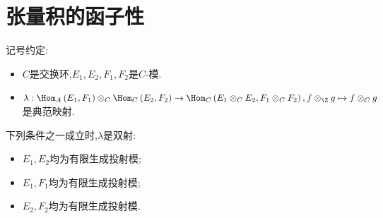 \section{张量积的函子性}

记号约定:

\begin{itemize}
	\item $C$是交换环,$E_{1},E_{2},F_{1},F_{2}$是$C$-模.
	\item $\lambda:\Hom_{A}\left(E_{1},F_{1}\right)\otimes_{C}\Hom_{C}\left(E_{2},F_{2}\right)\to\Hom_{C}\left(E_{1}\otimes_{C}E_{2},F_{1}\otimes_{C}F_{2}\right),f\otimes_{\Z}g\mapsto f\otimes_{C}g$是典范映射.
\end{itemize}

\begin{proposition}{}{}
	下列条件之一成立时,$\lambda$是双射:
	\begin{itemize}
		\item $E_{1},E_{2}$均为有限生成投射模;
		\item $E_{1},F_{1}$均为有限生成投射模;
		\item $E_{2},F_{2}$均为有限生成投射模.
	\end{itemize}
\end{proposition}

